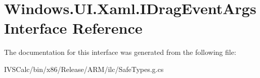 \hypertarget{interface_windows_1_1_u_i_1_1_xaml_1_1_i_drag_event_args}{}\section{Windows.\+U\+I.\+Xaml.\+I\+Drag\+Event\+Args Interface Reference}
\label{interface_windows_1_1_u_i_1_1_xaml_1_1_i_drag_event_args}


The documentation for this interface was generated from the following file\+:\begin{DoxyCompactItemize}
\item 
I\+V\+S\+Calc/bin/x86/\+Release/\+A\+R\+M/ilc/Safe\+Types.\+g.\+cs\end{DoxyCompactItemize}

